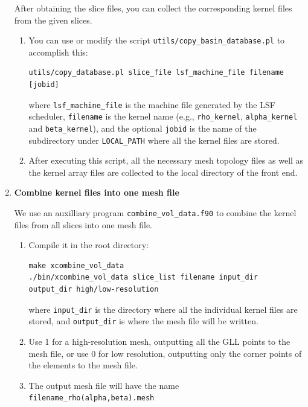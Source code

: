\begin{enumerate}
After obtaining the slice files, you can collect the corresponding
kernel files from the given slices.
\begin{enumerate}
\item You can use or modify the script \texttt{utils/copy\_basin\_database.pl}
to accomplish this:

{\small
\begin{verbatim}
utils/copy_database.pl slice_file lsf_machine_file filename [jobid]
\end{verbatim}
}
where \texttt{\small lsf\_machine\_file}{\small{} is the machine file
generated by the LSF scheduler, }\texttt{\small filename}{\small{}
is the kernel name (e.g., }\texttt{\small rho\_kernel}{\small , }\texttt{\small alpha\_kernel}{\small{}
and }\texttt{\small beta\_kernel}{\small ), and the optional }\texttt{\small jobid}{\small{}
is the name of the subdirectory under }\texttt{\small LOCAL\_PATH}{\small{}
where all the kernel files are stored.}{\small \par}

\item After executing this script, all the necessary mesh topology files
as well as the kernel array files are collected to the local directory
of the front end.
\end{enumerate}
\item \textbf{Combine kernel files into one mesh file}


We use an auxilliary program \texttt{combine\_vol\_data.f90} to combine
the kernel files from all slices into one mesh file.
\begin{enumerate}
\item Compile it in the root directory:
{\footnotesize
\begin{verbatim}
make xcombine_vol_data
./bin/xcombine_vol_data slice_list filename input_dir output_dir high/low-resolution
\end{verbatim}
}
where \texttt{input\_dir} is the directory where all the individual
kernel files are stored, and \texttt{output\_dir} is where the mesh
file will be written.

\item Use 1 for a high-resolution mesh, outputting all the GLL points to
the mesh file, or use 0 for low resolution, outputting only the corner
points of the elements to the mesh file.
\item The output mesh file will have the name \texttt{filename\_rho(alpha,beta).mesh}
\end{enumerate}


\end{enumerate}
